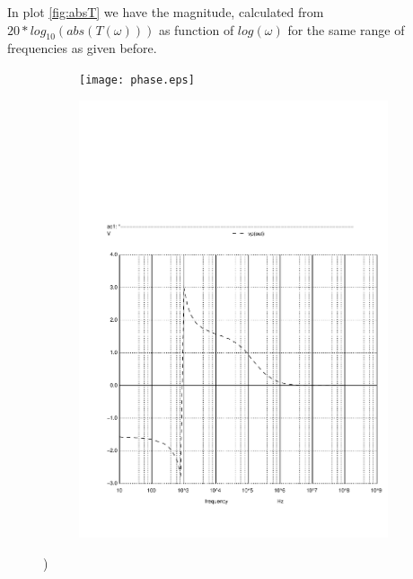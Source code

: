 In plot \ref{fig:absT} we have the magnitude, calculated from $20*log_{10}(abs(T(\omega)))$ as function of $log(\omega)$ for the same range of frequencies as given before.

\begin{figure}[h]
  \centering
  \begin{subfigure}{0.5\textwidth}
      \texttt{[image: phase.eps]}
      \label{fig:output1}
  \end{subfigure}
  \begin{subfigure}{0.4\textwidth}
      \includegraphics[width=\linewidth, clip]{phase.pdf}
      \label{fig:output2}
  \end{subfigure}
  \caption{\small  )}
  \label{output_deviation}
\end{figure}


